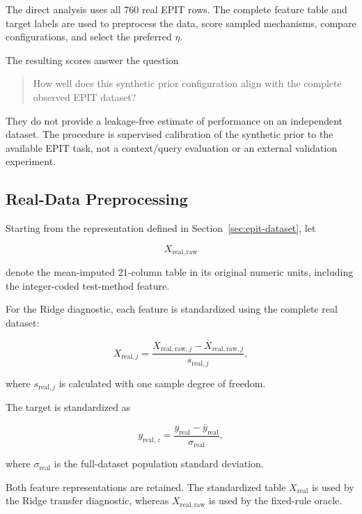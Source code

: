 \documentclass{article}
\begin{document}
The direct analysis uses all \(760\) real EPIT rows. The complete feature table and target labels are used to preprocess the data, score sampled mechanisms, compare configurations, and select the preferred \(\eta\).

The resulting scores answer the question

\begin{quote}
How well does this synthetic prior configuration align with the complete observed EPIT dataset?
\end{quote}

They do not provide a leakage-free estimate of performance on an independent dataset. The procedure is supervised calibration of the synthetic prior to the available EPIT task, not a context/query evaluation or an external validation experiment.

\subsection{Real-Data Preprocessing}

Starting from the representation defined in Section~\ref{sec:epit-dataset}, let

\[
X_{\mathrm{real,raw}}
\]

denote the mean-imputed \(21\)-column table in its original numeric units, including the integer-coded test-method feature.

For the Ridge diagnostic, each feature is standardized using the complete real dataset:

\begin{equation}
X_{\mathrm{real},j}
=
\frac{
X_{\mathrm{real,raw},j}
-
\overline X_{\mathrm{real,raw},j}
}{
s_{\mathrm{real},j}
},
\label{eq:real-feature-standardization}
\end{equation}

where \(s_{\mathrm{real},j}\) is calculated with one sample degree of freedom.

The target is standardized as

\begin{equation}
y_{\mathrm{real},z}
=
\frac{
y_{\mathrm{real}}
-
\overline y_{\mathrm{real}}
}{
\sigma_{\mathrm{real}}
},
\label{eq:real-target-standardization}
\end{equation}

where \(\sigma_{\mathrm{real}}\) is the full-dataset population standard deviation.

Both feature representations are retained. The standardized table \(X_{\mathrm{real}}\) is used by the Ridge transfer diagnostic, whereas \(X_{\mathrm{real,raw}}\) is used by the fixed-rule oracle.
\end{document}
